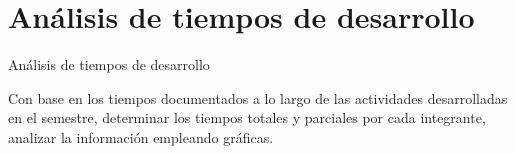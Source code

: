 \section{An\'alisis de tiempos de desarrollo}
\label{Analisis_tiempos_desarrollo}

An\'alisis de tiempos de desarrollo
\par

Con base en los tiempos documentados a lo largo de las actividades desarrolladas en el semestre, determinar los tiempos totales y parciales por cada integrante, analizar la información empleando gráficas. 
